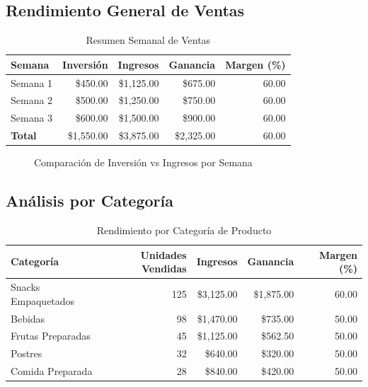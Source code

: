 \documentclass[12pt,a4paper]{article}
\begin{document}
\subsection{Rendimiento General de Ventas}
\begin{table}[h!]
\centering
\caption{Resumen Semanal de Ventas}
\begin{tabular}{|l|r|r|r|r|}
\hline
\textbf{Semana} & \textbf{Inversión} & \textbf{Ingresos} & \textbf{Ganancia} & \textbf{Margen (\%)} \\
\hline
Semana 1 & \$450.00 & \$1,125.00 & \$675.00 & 60.00 \\
Semana 2 & \$500.00 & \$1,250.00 & \$750.00 & 60.00 \\
Semana 3 & \$600.00 & \$1,500.00 & \$900.00 & 60.00 \\
\hline
\textbf{Total} & \$1,550.00 & \$3,875.00 & \$2,325.00 & 60.00 \\
\hline
\end{tabular}
\end{table}

\begin{figure}[h!]
\centering
{}
\caption{Comparación de Inversión vs Ingresos por Semana}
\end{figure}

\subsection{Análisis por Categoría}
\begin{table}[h!]
\centering
\caption{Rendimiento por Categoría de Producto}
\begin{tabular}{|l|r|r|r|r|}
\hline
\textbf{Categoría} & \textbf{Unidades Vendidas} & \textbf{Ingresos} & \textbf{Ganancia} & \textbf{Margen (\%)} \\
\hline
Snacks Empaquetados & 125 & \$3,125.00 & \$1,875.00 & 60.00 \\
Bebidas & 98 & \$1,470.00 & \$735.00 & 50.00 \\
Frutas Preparadas & 45 & \$1,125.00 & \$562.50 & 50.00 \\
Postres & 32 & \$640.00 & \$320.00 & 50.00 \\
Comida Preparada & 28 & \$840.00 & \$420.00 & 50.00 \\
\hline
\end{tabular}
\end{table}
\end{document}
